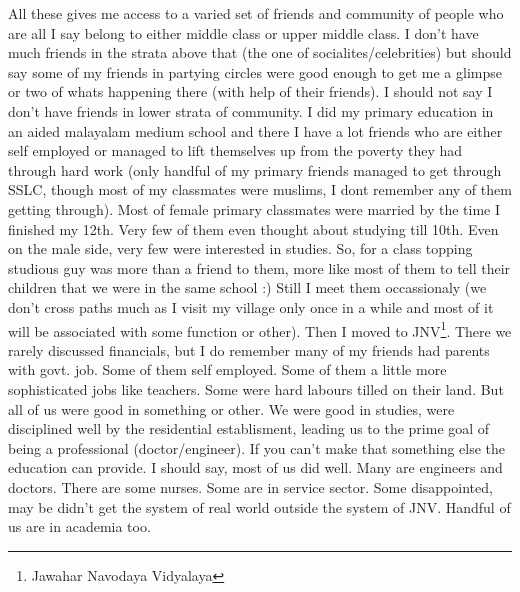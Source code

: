 All these gives me access to a varied set of friends and community of people who are all I say 
belong to either middle class or upper middle class. I don't have much friends in the strata above 
that (the one of socialites/celebrities) but should say some of my friends in partying circles 
were good enough to get me a glimpse or two of whats happening there (with help of their friends). 
I should not say I don't have friends in lower strata of community. I did my primary education 
in an aided malayalam medium school and there I have a lot friends who are either self employed 
or managed to lift themselves up from the poverty they had through hard work (only handful of my 
primary friends managed to get through SSLC, though most of my classmates were muslims, I dont 
remember any of them getting through). Most of female primary classmates were married by the time 
I finished my 12th. Very few of them even thought about studying till 10th. Even on the male side, 
very few were interested in studies. So, for a class topping studious guy was more than a friend 
to them, more like most of them to tell their children that we were in the same school :) Still 
I meet them occassionaly (we don't cross paths much as I visit my village only once in a while 
and most of it will be associated with some function or other). Then I moved to JNV\footnote{Jawahar Navodaya Vidyalaya}. There we rarely discussed financials, but I do remember many of my friends had
parents with govt. job. Some of them self employed. Some of them a little more sophisticated jobs 
like teachers. Some were hard labours tilled on their land. But all of us were good in something 
or other. We were good in
studies, were disciplined well by the residential establisment, leading us to the prime goal of 
being a professional (doctor/engineer). If you can't make that something else the education can 
provide. I should say, most of us did well. Many are engineers and doctors. There are some nurses. 
Some are in service sector. Some disappointed, may be didn't get the system of real world outside 
the system of JNV. Handful of us are in academia too. 

